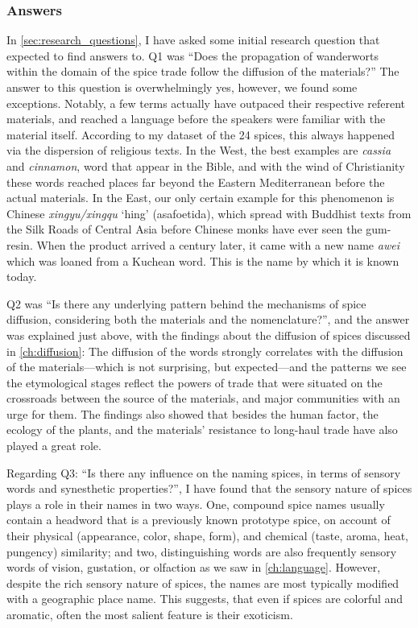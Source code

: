 \subsubsection{Answers}

In \cref{sec:research_questions}, I have asked some initial research question that expected to find answers to. Q1 was ``Does the propagation of \glspl{wanderwort} within the domain of the spice trade follow the diffusion of the materials?'' The answer to this question is overwhelmingly yes, however, we found some exceptions. Notably, a few terms actually have outpaced their respective referent materials, and reached a language before the speakers were familiar with the material itself. According to my dataset of the 24 spices, this always happened via the dispersion of religious texts. In the West, the best examples are \textit{cassia} and \textit{cinnamon}, word that appear in the Bible, and with the wind of Christianity these words reached places far beyond the Eastern Mediterranean before the actual materials. In the East, our only certain example for this phenomenon is Chinese \textit{xingyu/xingqu} `hing' (asafoetida), which spread with Buddhist texts from the Silk Roads of Central Asia before Chinese monks have ever seen the gum-resin. When the product arrived a century later, it came with a new name \textit{awei} which was loaned from a Kuchean word. This is the name by which it is known today.

Q2 was ``Is there any underlying pattern behind the mechanisms of spice diffusion, considering both the materials and the nomenclature?'', and the answer was explained just above, with the findings about the diffusion of spices discussed in \cref{ch:diffusion}: The diffusion of the words strongly correlates with the diffusion of the materials---which is not surprising, but expected---and the patterns we see the etymological stages reflect the powers of trade that were situated on the crossroads between the source of the materials, and major communities with an urge for them. The findings also showed that besides the human factor, the ecology of the plants, and the materials' resistance to long-haul trade have also played a great role.

Regarding Q3: ``Is there any influence on the naming spices, in terms of sensory words and synesthetic properties?'', I have found that the sensory nature of spices plays a role in their names in two ways. One, compound spice names usually contain a headword that is a previously known prototype spice, on account of their physical (appearance, color, shape, form), and chemical (taste, aroma, heat, pungency) similarity; and two, distinguishing words are also frequently sensory words of vision, gustation, or olfaction as we saw in \cref{ch:language}. However, despite the rich sensory nature of spices, the names are most typically modified with a geographic place name. This suggests, that even if spices are colorful and aromatic, often the most salient feature is their exoticism.
    
